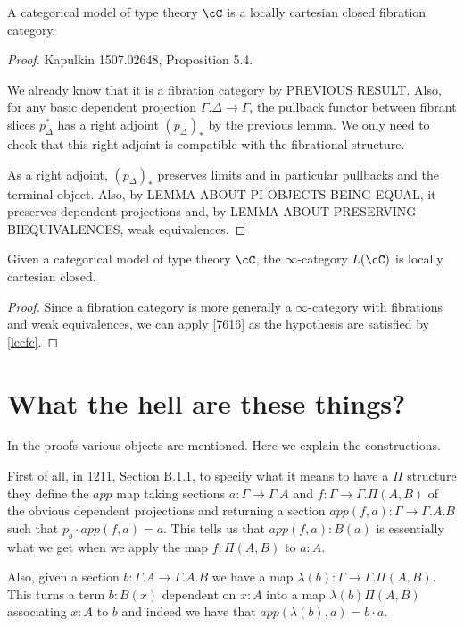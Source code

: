 \documentclass[a4paper,fontsize=12pt]{scrartcl}
\begin{document}
\begin{prop}\label{lccfc}
  A categorical model of type theory $\cC$ is a locally cartesian closed
  fibration category.
\end{prop}
\begin{proof}
  Kapulkin 1507.02648, Proposition 5.4.

  We already know that it is a
  fibration category by PREVIOUS RESULT. Also, for any basic dependent projection
  $\Gamma.\Delta\rightarrow\Gamma$, the pullback functor between fibrant slices
  $p^*_\Delta$ has a right adjoint $(p_\Delta)_*$ by the previous lemma.
  We only need to check that this right adjoint is
  compatible with the fibrational structure.

  As a right adjoint, $(p_\Delta)_*$ preserves limits and in particular pullbacks and
  the terminal object. Also, by LEMMA ABOUT PI OBJECTS BEING EQUAL, it preserves
  dependent projections and, by LEMMA ABOUT PRESERVING BIEQUIVALENCES, weak
  equivalences.
\end{proof}

\begin{thm}
  Given a categorical model of type theory $\cC$, the $\infty$-category $L(\cC)$
  is locally cartesian closed.
\end{thm}
\begin{proof}
  Since a fibration category is more generally a $\infty$-category with
  fibrations and weak equivalences, we can apply \ref{7616} as the hypothesis
  are satisfied by \ref{lccfc}.
\end{proof}

\section{What the hell are these things?}

In the proofs various objects are mentioned. Here we explain the constructions.

First of all, in 1211, Section B.1.1, to specify what it means to have a $\Pi$
structure they define the $app$ map taking sections
$a\colon\Gamma\rightarrow\Gamma.A$ and $f\colon\Gamma\rightarrow\Gamma.\Pi(A,B)$
of the obvious dependent projections and returning a section
$app(f,a)\colon\Gamma\rightarrow\Gamma.A.B$ such that $p_b\cdot app(f,a)=a$.
This tells us that $app(f,a):B(a)$ is essentially what we get when we apply the
map $f:\Pi(A,B)$ to $a:A$.

Also, given a section $b\colon\Gamma.A\rightarrow\Gamma.A.B$ we have a map
$\lambda(b)\colon\Gamma\rightarrow\Gamma.\Pi(A,B)$. This turns a term $b:B(x)$
dependent on $x:A$ into a map $\lambda(b)\Pi(A,B)$ associating $x:A$ to $b$ and
indeed we have that $app(\lambda(b),a)=b\cdot a$.
\end{document}
